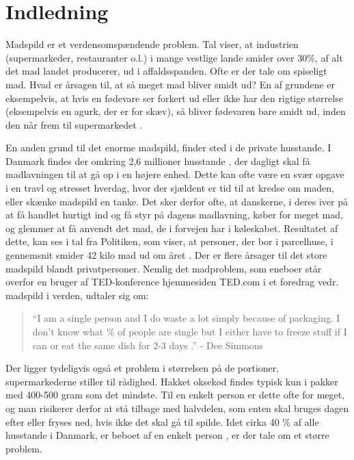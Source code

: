 \chapter{Indledning}
\label{sec:indledning}

Madspild er et verdensomspændende problem\cite{gustavssonSpild}. Tal viser, at industrien (supermarkeder, restauranter o.l.) i mange vestlige lande smider over 30\%, af alt det mad landet producerer, ud i affaldsspanden\cite{gustavssonSpild}. Ofte er der tale om spiseligt mad. Hvad er årsagen til, at så meget mad bliver smidt ud? En af grundene er eksempelvis, at hvis en fødevare ser forkert ud eller ikke har den rigtige størrelse (eksempelvis en agurk, der er for skæv), så bliver fødevaren bare smidt ud, inden den når frem til \fx supermarkedet \cite{tedmadspild}. 

En anden grund til det enorme madspild, finder sted i de private husstande. I Danmark findes der omkring 2,6 millioner husstande \cite{husstande}, der dagligt skal få madlavningen til at gå op i en højere enhed. Dette kan ofte være en svær opgave i en travl og stresset hverdag, hvor der sjældent er tid til at kredse om maden, eller skænke madspild en tanke. Det sker derfor ofte, at danskerne, i deres iver på at få handlet hurtigt ind og få styr på dagens madlavning, køber for meget mad, og glemmer at få anvendt det mad, de i forvejen har i køleskabet. Resultatet af dette, kan ses i tal fra Politiken, som viser, at personer, der bor i parcelhuse, i gennemsnit smider 42 kilo mad ud om året \cite{madspildpol}. Der er flere årsager til det store madspild blandt privatpersoner. Nemlig det madproblem, som eneboer står overfor en bruger af TED-konference hjemmesiden TED.com i et foredrag vedr. madspild i verden, udtaler sig om: 

\begin{quote}
``I am a single person and I do waste a lot simply because of packaging. I don't know what \% of people are single but I either have to freeze stuff if I can or eat the same dish for 2-3 days \cite{tedcomment}.'' - Dee Simmons
\end{quote}
 
Der ligger tydeligvis også et problem i størrelsen på de portioner, supermarkederne stiller til rådighed. Hakket oksekød findes typisk kun i pakker med 400-500 gram som det mindste. Til en enkelt person er dette ofte for meget, og man risikerer derfor at stå tilbage med halvdelen, som enten skal bruges dagen efter eller fryses ned, hvis ikke det skal gå til spilde. Idet cirka 40 \% af alle husstande i Danmark, er beboet af en enkelt person \cite{madspild16}, er der tale om et større problem.

